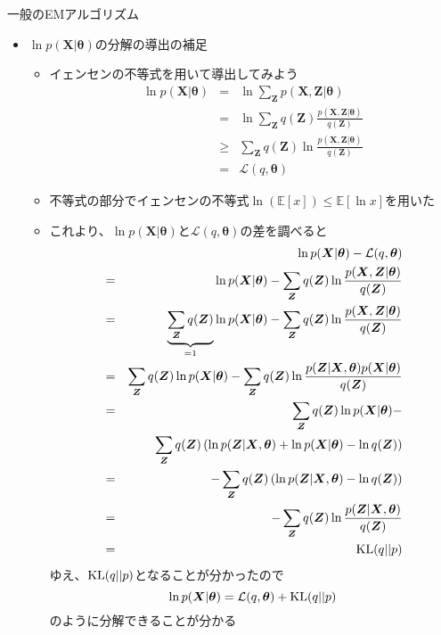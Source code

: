 \documentclass[dvipdfmx,notheorems,t]{beamer}
\begin{document}
\begin{frame}{一般のEMアルゴリズム}

\begin{itemize}
	\item $\ln p(\bm{X} | \bm{\theta})$の分解の導出の補足
	\begin{itemize}
		\item イェンセンの不等式を用いて導出してみよう
		\begin{eqnarray}
			\ln p(\bm{X} | \bm{\theta}) &=& \ln \sum_{\bm{Z}} p(\bm{X}, \bm{Z} | \bm{\theta}) \nonumber \\
			&=& \ln \sum_{\bm{Z}} q(\bm{Z}) \frac{p(\bm{X}, \bm{Z} | \bm{\theta})}{q(\bm{Z})} \nonumber \\
			&\ge& \sum_{\bm{Z}} q(\bm{Z}) \ln \frac{p(\bm{X}, \bm{Z} | \bm{\theta})}{q(\bm{Z})} \nonumber \\
			&=& \mathcal{L}(q, \bm{\theta})
		\end{eqnarray}
		
		\item 不等式の部分でイェンセンの不等式$\ln (\mathbb{E}[x]) \le \mathbb{E}[\ln x]$を用いた
		\item これより、$\ln p(\bm{X} | \bm{\theta})$と$\mathcal{L}(q, \bm{\theta})$の差を調べると
		\begin{eqnarray}
			&& \ln p(\bm{X} | \bm{\theta}) - \mathcal{L}(q, \bm{\theta}) \nonumber \\
			&=& \ln p(\bm{X} | \bm{\theta}) - \sum_{\bm{Z}} q(\bm{Z}) \ln \frac{p(\bm{X}, \bm{Z} | \bm{\theta})}{q(\bm{Z})} \nonumber \\
			&=& \underbrace{\sum_{\bm{Z}} q(\bm{Z})}_{=1} \ln p(\bm{X} | \bm{\theta}) - \sum_{\bm{Z}} q(\bm{Z}) \ln \frac{p(\bm{X}, \bm{Z} | \bm{\theta})}{q(\bm{Z})} \nonumber \\
			&=& \sum_{\bm{Z}} q(\bm{Z}) \ln p(\bm{X} | \bm{\theta}) - \sum_{\bm{Z}} q(\bm{Z}) \ln \frac{p(\bm{Z} | \bm{X}, \bm{\theta}) p(\bm{X} | \bm{\theta})}{q(\bm{Z})} \nonumber \\
			&=& \sum_{\bm{Z}} q(\bm{Z}) \ln p(\bm{X} | \bm{\theta}) - \nonumber \\
			&& \qquad \sum_{\bm{Z}} q(\bm{Z}) \left( \ln p(\bm{Z} | \bm{X}, \bm{\theta}) + \ln p(\bm{X} | \bm{\theta}) - \ln q(\bm{Z}) \right) \nonumber \\
			&=& -\sum_{\bm{Z}} q(\bm{Z}) \left( \ln p(\bm{Z} | \bm{X}, \bm{\theta}) - \ln q(\bm{Z}) \right) \nonumber \\
			&=& -\sum_{\bm{Z}} q(\bm{Z}) \ln \frac{p(\bm{Z} | \bm{X}, \bm{\theta})}{q(\bm{Z})} \nonumber \\
			&=& \operatorname{KL} (q || p)
		\end{eqnarray}
		ゆえ、$\operatorname{KL} (q || p)$となることが分かったので
		\begin{equation}
			\ln p(\bm{X} | \bm{\theta}) = \mathcal{L}(q, \bm{\theta}) + \operatorname{KL} (q || p)
		\end{equation}
		のように分解できることが分かる
	\end{itemize}
\end{itemize}

\end{frame}
\end{document}
